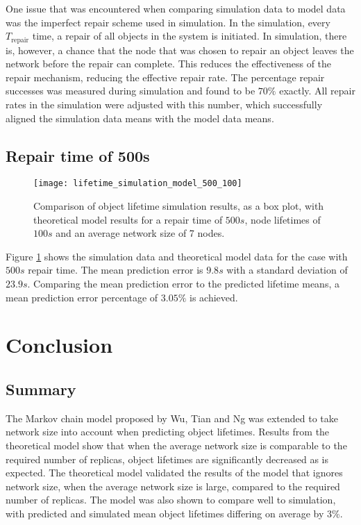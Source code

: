 One issue that was encountered when comparing simulation data to model data was the imperfect repair scheme used in simulation. In the simulation, every $T_{\textrm{repair}}$ time, a repair of all objects in the system is initiated. In simulation, there is, however, a chance that the node that was chosen to repair an object leaves the network before the repair can complete. This reduces the effectiveness of the repair mechanism, reducing the effective repair rate. The percentage repair successes was measured during simulation and found to be $70\%$ exactly. All repair rates in the simulation were adjusted with this number, which successfully aligned the simulation data means with the model data means.

\subsection{Repair time of 500s}

\begin{figure}[htbp]
 \centering
 \texttt{[image: lifetime\_simulation\_model\_500\_100]}
 \caption{Comparison of object lifetime simulation results, as a box plot, with theoretical model results for a repair time of $500s$, node lifetimes of $100s$ and an average network size of 7 nodes.}
 \label{fig_lifetime_simulation_model_500_100}
\end{figure}
%
Figure \ref{fig_lifetime_simulation_model_500_100} shows the simulation data and theoretical model data for the case with $500s$ repair time. The mean prediction error is $9.8s$ with a standard deviation of $23.9s$. Comparing the mean prediction error to the predicted lifetime means, a mean prediction error percentage of $3.05\%$ is achieved.

\section{Conclusion}

\subsection{Summary}
The Markov chain model proposed by Wu, Tian and Ng was extended to take network size into account when predicting object lifetimes. Results from the theoretical model show that when the average network size is comparable to the required number of replicas, object lifetimes are significantly decreased as is expected. The theoretical model validated the results of the model that ignores network size, when the average network size is large, compared to the required number of replicas. The model was also shown to compare well to simulation, with predicted and simulated mean object lifetimes differing on average by 3\%.

